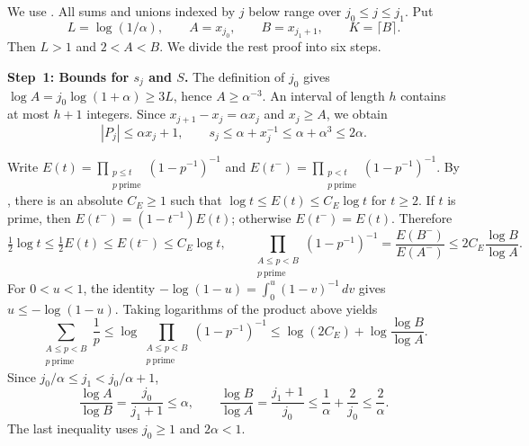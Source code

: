\documentclass[twoside]{aomart}
\makeatletter
\theoremstyle{paperplain}
\theoremstyle{paperdefinition}
\renewenvironment{proof}[1][\proofname]{\par\pushQED{\qed}%
  \normalfont\topsep6\p@\@plus3\p@\relax\trivlist
  \item[\hskip\labelsep\itshape #1\@addpunct{.}]\ignorespaces
}{\popQED\endtrivlist\@endpefalse}
\numberwithin{equation}{section}
\makeatother
\begin{document}
\begin{proof}
We use .
All sums and unions indexed by $j$ below range over
$j_0\le j\le j_1$. Put
\begin{equation*}
 L=\log(1/\alpha),\qquad A=x_{j_0},\qquad B=x_{j_1+1},
 \qquad K=\lceil B\rceil.
 \end{equation*}
Then $L>1$ and $2<A<B$. We divide the rest proof into six steps.

\par
\medskip
\noindent\textbf{Step~1: Bounds for $s_j$ and $S$.}
The definition of $j_0$ gives
$\log A=j_0\log(1+\alpha)\ge3L$, hence $A\ge\alpha^{-3}$.
An interval of length $h$ contains at most $h+1$ integers.
Since $x_{j+1}-x_j=\alpha x_j$ and $x_j\ge A$, we obtain
\begin{equation}
 |P_j|\le\alpha x_j+1,\qquad
 s_j\le\alpha+x_j^{-1}\le\alpha+\alpha^3\le2\alpha.
 \label{sc:decomposition-block-size}
\end{equation}

Write $\displaystyle E(t)=\prod_{\substack{p\le t\\p\ \mathrm{prime}}}(1-p^{-1})^{-1}$ and
$\displaystyle E(t^-)=\prod_{\substack{p<t\\p\ \mathrm{prime}}}(1-p^{-1})^{-1}$.
By , there is an absolute $C_E\ge1$
such that $\log t\le E(t)\le C_E\log t$ for $t\ge2$.
If $t$ is prime, then $E(t^-)=(1-t^{-1})E(t)$;
otherwise $E(t^-)=E(t)$. Therefore
\begin{equation*}
 \tfrac12\log t\le\tfrac12 E(t)\le E(t^-)\le C_E\log t,
 \qquad
 \prod_{\substack{A\le p<B\\p\ \mathrm{prime}}}(1-p^{-1})^{-1}
 =\frac{E(B^-)}{E(A^-)}\le2C_E\frac{\log B}{\log A}.
 \end{equation*}
For $0<u<1$, the identity
$\displaystyle -\log(1-u)=\int_0^u(1-v)^{-1}\,dv$ gives
$u\le-\log(1-u)$. Taking logarithms of the product above yields
\begin{equation*}
 \sum_{\substack{A\le p<B\\p\ \mathrm{prime}}}\frac1p
 \le\log\prod_{\substack{A\le p<B\\p\ \mathrm{prime}}}(1-p^{-1})^{-1}
 \le\log(2C_E)+\log\frac{\log B}{\log A}.
 \end{equation*}
Since $j_0/\alpha\le j_1<j_0/\alpha+1$,
\begin{equation}
 \frac{\log A}{\log B}=\frac{j_0}{j_1+1}\le\alpha,
 \qquad
 \frac{\log B}{\log A}=\frac{j_1+1}{j_0}
 \le\frac1\alpha+\frac2{j_0}\le\frac2\alpha.
 \label{sc:decomposition-log-ratios}
\end{equation}
The last inequality uses $j_0\ge1$ and $2\alpha<1$.


\end{proof}
\end{document}
